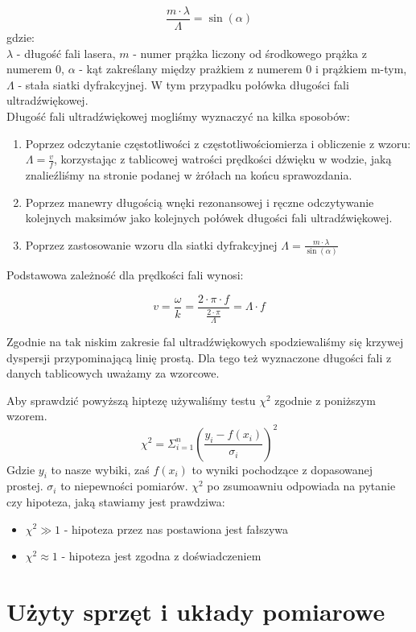 \documentclass[a4paper,12pt]{article}
\begin{document}
$$ \frac{m \cdot \lambda}{\Lambda}=\sin (\alpha) $$
gdzie: \\
$\lambda$ - długość fali lasera, 
$m$ - numer prążka liczony od środkowego prążka z numerem 0, 
$ \alpha $ - kąt zakreślany między prażkiem z numerem 0 i prążkiem m-tym,
$ \Lambda $ - stała siatki dyfrakcyjnej. W tym przypadku połówka długości fali ultradźwiękowej. \\

Długość fali ultradźwiękowej mogliśmy wyznaczyć na kilka sposobów:
\begin{enumerate}
  \item Poprzez odczytanie częstotliwości z częstotliwościomierza  i obliczenie z wzoru: $\Lambda=\frac{v}{f}$, korzystając z tablicowej watrości prędkości dźwięku w wodzie, jaką znalieźliśmy na stronie podanej w żrółach na końcu sprawozdania. 
  \item Poprzez manewry długością wnęki rezonansowej i ręczne odczytywanie kolejnych maksimów jako kolejnych połówek długości fali ultradźwiękowej.
  \item Poprzez zastosowanie wzoru dla siatki dyfrakcyjnej $\Lambda=\frac{m \cdot \lambda}{\sin (\alpha)}$
\end{enumerate}

Podstawowa zależność dla prędkości fali wynosi: 

$$v = \frac{\omega}{k} = \frac{2\cdot \pi \cdot f }{\frac{2\cdot \pi}{\Lambda} }= \Lambda \cdot f $$

Zgodnie na tak niskim zakresie fal ultradźwiękowych spodziewaliśmy się krzywej dyspersji przypominającą linię prostą. Dla tego też wyznaczone długości fali z danych tablicowych uważamy za wzorcowe. 



Aby sprawdzić powyższą hiptezę używaliśmy testu $\chi^2$ zgodnie z poniższym wzorem. 
$$
\chi^2 = \Sigma_{i=1}^n {\left( \frac{y_i - f(x_i)}{\sigma_i} \right)}^2
$$
Gdzie $y_i$ to nasze wybiki, zaś $f(x_i)$ to wyniki pochodzące z dopasowanej prostej. $\sigma_i$ to niepewności pomiarów. 
$\chi^2$ po zsumoawniu odpowiada na pytanie czy hipoteza, jaką stawiamy jest prawdziwa: 
\begin{itemize}
  \item $\chi^2 \gg 1$ - hipoteza przez nas postawiona jest fałszywa 
  \item $\chi^2 \approx 1$ - hipoteza jest zgodna z doświadczeniem
\end{itemize}


\section{Użyty sprzęt i układy pomiarowe}
\end{document}
